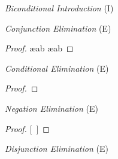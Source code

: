 \begin{multicols}{2}
\textit{Biconditional Introduction} (\eiff I) \vspace{-1em}

\begin{fitchproof}
	\open
		 
	\close
\breakline
	\open
		 
	\close
\end{fitchproof}

\vfill\null
\columnbreak


\textit{Conjunction Elimination} (\eand E) \vspace{-1em}

\begin{proof}
	 \ae{ab}
	 \ae{ab}
\end{proof}

\vspace{0.75em}

\textit{Conditional Elimination} (\eif E)  \vspace{-1em}

\begin{proof}
	 
\end{proof}

\vspace{0.45em}

\textit{Negation Elimination} (\enot E)  \vspace{-1em}

\begin{proof}
\open
	 
	\ellipsesline
	\metaB{}
\close
{}[\ ]\metaA{}
\end{proof}

\vspace{1em}

\textit{Disjunction Elimination} (\eor E)  \vspace{-1em}


\end{multicols}
